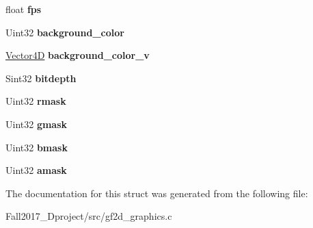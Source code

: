 \begin{DoxyCompactItemize}
float {\bfseries fps}
\item 
\mbox{\label{struct_graphics_a1c0a2151384504ba10ec191123ea49ea}} 
Uint32 {\bfseries background\+\_\+color}
\item 
\mbox{\label{struct_graphics_a01b2ad95a4c29706622881d77e854710}} 
\hyperlink{struct_vector4_d}{Vector4D} {\bfseries background\+\_\+color\+\_\+v}
\item 
\mbox{\label{struct_graphics_a2775bf585a008fac53e2fecc76d741d5}} 
Sint32 {\bfseries bitdepth}
\item 
\mbox{\label{struct_graphics_abaa324464d263874f147a6f765fa5ae3}} 
Uint32 {\bfseries rmask}
\item 
\mbox{\label{struct_graphics_abe7f918e209b53255fca00261ef7080a}} 
Uint32 {\bfseries gmask}
\item 
\mbox{\label{struct_graphics_ae2cea4e37a615cd01440c7e50850680e}} 
Uint32 {\bfseries bmask}
\item 
\mbox{\label{struct_graphics_a6152ea1d7ac4b55559226810aac1ba4f}} 
Uint32 {\bfseries amask}
\end{DoxyCompactItemize}


The documentation for this struct was generated from the following file\+:\begin{DoxyCompactItemize}
\item 
Fall2017\+\_\+Dproject/src/gf2d\+\_\+graphics.\+c\end{DoxyCompactItemize}
